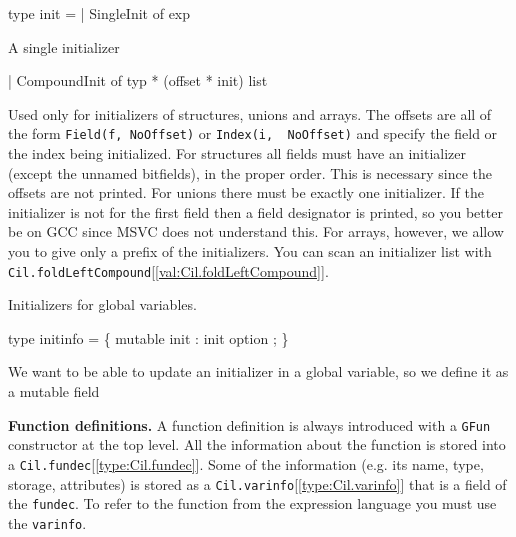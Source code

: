 \documentclass[11pt]{article}
\begin{document}
\label{type:Cil.init}\begin{ocamldoccode}
type init =
  | SingleInit of exp
\end{ocamldoccode}
\begin{ocamldoccomment}
A single initializer
\end{ocamldoccomment}
\begin{ocamldoccode}
  | CompoundInit of typ * (offset * init) list
\end{ocamldoccode}
\begin{ocamldoccomment}
Used only for initializers of structures, unions and arrays. The 
 offsets are all of the form {\tt{Field(f, NoOffset)}} or {\tt{Index(i, \
 NoOffset)}} and specify the field or the index being initialized. For 
 structures all fields must have an initializer (except the unnamed 
 bitfields), in the proper order. This is necessary since the offsets 
 are not printed. For unions there must be exactly one initializer. If 
 the initializer is not for the first field then a field designator is 
 printed, so you better be on GCC since MSVC does not understand this. 
 For arrays, however, we allow you to give only a prefix of the 
 initializers. You can scan an initializer list with 
 {\tt{Cil.foldLeftCompound}}[\ref{val:Cil.foldLeftCompound}].
\end{ocamldoccomment}
\begin{ocamldocdescription}
Initializers for global variables.


\end{ocamldocdescription}




\label{type:Cil.initinfo}\begin{ocamldoccode}
type initinfo = \{
  mutable init : init option ;
\}
\end{ocamldoccode}
\begin{ocamldocdescription}
We want to be able to update an initializer in a global variable, so we 
 define it as a mutable field


\end{ocamldocdescription}




{\bf Function definitions.} 
A function definition is always introduced with a {\tt{GFun}} constructor at the
top level. All the information about the function is stored into a
{\tt{Cil.fundec}}[\ref{type:Cil.fundec}]. Some of the information (e.g. its name, type,
storage, attributes) is stored as a {\tt{Cil.varinfo}}[\ref{type:Cil.varinfo}] that is a field of the
{\tt{fundec}}. To refer to the function from the expression language you must use
the {\tt{varinfo}}. 
\end{document}
